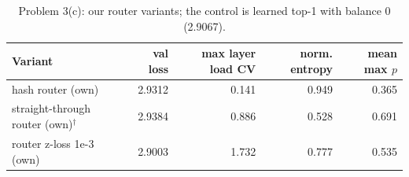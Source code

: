 \begin{table}[H]\centering\small
\caption{Problem 3(c): our router variants; the control is learned top-1 with balance 0 (2.9067).}\label{tab:p3own}
\begin{tabular}{lrrrr}\toprule
Variant & val loss & max layer load CV & norm. entropy & mean max $p$ \\ \midrule
hash router (own) & 2.9312 & 0.141 & 0.949 & 0.365 \\
straight-through router (own)$^\dagger$ & 2.9384 & 0.886 & 0.528 & 0.691 \\
router z-loss 1e-3 (own) & 2.9003 & 1.732 & 0.777 & 0.535 \\
\bottomrule\end{tabular}
\end{table}